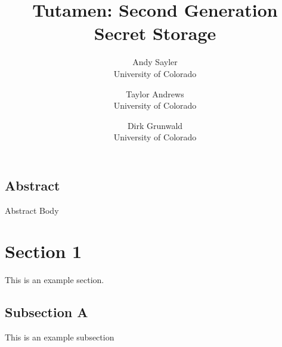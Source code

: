 \documentclass[letterpaper,twocolumn,10pt]{article}
\begin{document}
\date{}

\title{\Large \bf Tutamen: Second Generation Secret Storage}

\author{
{\rm Andy Sayler}\\
University of Colorado
\and
{\rm Taylor Andrews}\\
University of Colorado
\and
{\rm Dirk Grunwald}\\
University of Colorado
} %

\maketitle


\subsection*{Abstract}
Abstract Body

\section{Section 1}
\label{sec:section1}

This is an example section.

\subsection{Subsection A}
\label{sec:section1A}

This is an example subsection

{
  \footnotesize
  
  
}
\end{document}
